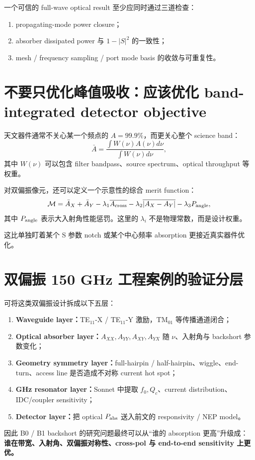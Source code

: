 \documentclass[11pt,a4paper,openany]{ctexrep}
\begin{document}
\begin{checkpointbox}
一个可信的 full-wave optical result 至少应同时通过三道检查：
\begin{enumerate}
  \item propagating-mode power closure；
  \item absorber dissipated power 与 $1-|S|^2$ 的一致性；
  \item mesh / frequency sampling / port mode basis 的收敛与可重复性。
\end{enumerate}
\end{checkpointbox}

\section{不要只优化峰值吸收：应该优化 band-integrated detector objective}

天文器件通常不关心某一个频点的 $A=99.9\%$，而更关心整个 science band：
\[
\bar A=\frac{\int W(\nu)A(\nu)d\nu}{\int W(\nu)d\nu},
\]
其中 $W(\nu)$ 可以包含 filter bandpass、source spectrum、optical throughput 等权重。

对双偏振像元，还可以定义一个示意性的综合 merit function：
\[
\mathcal M=
\bar A_X+\bar A_Y
-\lambda_1\overline{A_{\rm cross}}
-\lambda_2\overline{|A_X-A_Y|}
-\lambda_3 P_{\rm angle},
\]
其中 $P_{\rm angle}$ 表示大入射角性能惩罚。这里的 $\lambda_i$ 不是物理常数，而是设计权重。

这比单独盯着某个 S 参数 notch 或某个中心频率 absorption 更接近真实器件优化。

\section{双偏振 150 GHz 工程案例的验证分层}

\begin{projectbox}
可将这类双偏振设计拆成以下五层：
\begin{enumerate}
  \item \textbf{Waveguide layer：}TE$_{11}$-X / TE$_{11}$-Y 激励，TM$_{01}$ 等传播通道闭合；
  \item \textbf{Optical absorber layer：}$A_{XX},A_{YY},A_{XY},A_{YX}$ 随 $\nu$、入射角与 backshort 参数变化；
  \item \textbf{Geometry symmetry layer：}full-hairpin / half-hairpin、wiggle、end-turn、access line 是否造成不对称 current hot spot；
  \item \textbf{GHz resonator layer：}Sonnet 中提取 $f_0,Q_c$、current distribution、IDC/coupler sensitivity；
  \item \textbf{Detector layer：}把 optical $P_{\rm abs}$ 送入前文的 responsivity / NEP model。
\end{enumerate}
因此 B0 / B1 backshort 的研究问题最终可以从“谁的 absorption 更高”升级成：\textbf{谁在带宽、入射角、双偏振对称性、cross-pol 与 end-to-end sensitivity 上更优。}
\end{projectbox}
\end{document}
